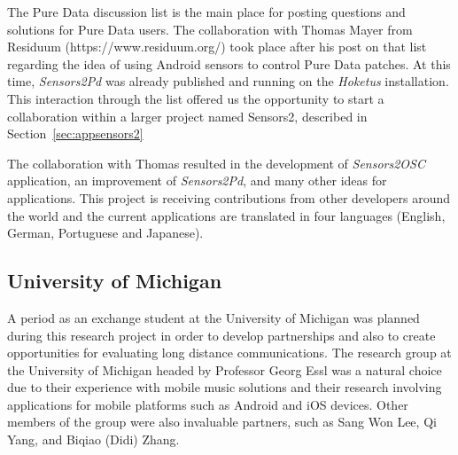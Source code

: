 The Pure Data discussion list is the main place for posting questions and solutions for Pure Data users.
The collaboration with Thomas Mayer from Residuum (https://www.residuum.org/) took place after his post on that list regarding the idea of using Android sensors to control Pure Data patches.
At this time, \textit{Sensors2Pd} was already published and running on the \textit{Hoketus} installation.
This interaction through the list offered us the opportunity to start a collaboration within a larger project named Sensors2, described in Section~\ref{sec:appsensors2}

The collaboration with Thomas resulted in the development of \textit{Sensors2OSC} application, an improvement of \textit{Sensors2Pd}, and many other ideas for applications.
This project is receiving contributions from other developers around the world and the current applications are translated in four languages (English, German, Portuguese and Japanese).

\subsection*{University of Michigan}


A period as an exchange student at the University of Michigan was planned during this research project in order to develop partnerships and also to create opportunities for evaluating long distance communications.
The research group at the University of Michigan headed by Professor Georg Essl was a natural choice due to their experience with mobile music solutions and their research involving applications for mobile platforms such as Android and iOS devices.
Other members of the group were also invaluable partners, such as Sang Won Lee, Qi Yang, and Biqiao (Didi) Zhang.

